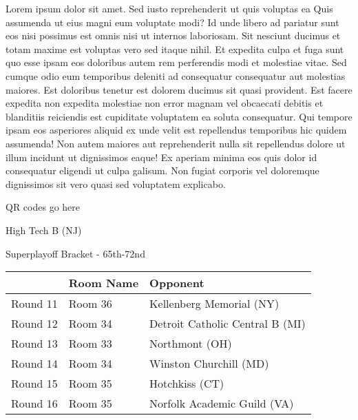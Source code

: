 \documentclass{article}%
\begin{document}
\vspace*{8pt}%
\linebreak%
\newline%
\newline%
    Lorem ipsum dolor sit amet. Sed iusto reprehenderit ut quis voluptas ea Quis assumenda ut eius magni eum voluptate modi? Id unde libero ad pariatur sunt eos nisi possimus est omnis nisi ut internos laboriosam. Sit nesciunt ducimus et totam maxime est voluptas vero sed itaque nihil. Et expedita culpa et fuga sunt quo esse ipsam eos doloribus autem rem perferendis modi et molestiae vitae.\newline%
\newline%
    Sed cumque odio eum temporibus deleniti ad consequatur consequatur aut molestias maiores. Est doloribus tenetur est dolorem ducimus sit quasi provident. Est facere expedita non expedita molestiae non error magnam vel obcaecati debitis et blanditiis reiciendis est cupiditate voluptatem ea soluta consequatur. Qui tempore ipsam eos asperiores aliquid ex unde velit est repellendus temporibus hic quidem assumenda!\newline%
\newline%
    Non autem maiores aut reprehenderit nulla sit repellendus dolore ut illum incidunt ut dignissimos eaque! Ex aperiam minima eos quis dolor id consequatur eligendi ut culpa galisum. Non fugiat corporis vel doloremque dignissimos sit vero quasi sed voluptatem explicabo.\newline%
\newline%
\vspace*{30pt}%
\begin{center}%
\begin{Huge}%
QR codes go here%
\end{Huge}%
\end{center}%
\newpage%
\begin{center}%
\begin{Huge}%
High Tech B (NJ)%
\end{Huge}%
\vspace*{8pt}%
\linebreak%
\begin{Large}%
Superplayoff Bracket {-} 65th{-}72nd%
\end{Large}%
\end{center}%
%
\begin{tabularx}{\textwidth}{|c|Y|Y|}%
\hline%
&Room Name&Opponent\\%
\hline%
Round 11&Room 36&Kellenberg Memorial (NY)\\%
Round 12&Room 34&Detroit Catholic Central B (MI)\\%
Round 13&Room 33&Northmont (OH)\\%
Round 14&Room 34&Winston Churchill (MD)\\%
Round 15&Room 35&Hotchkiss (CT)\\%
Round 16&Room 35&Norfolk Academic Guild (VA)\\%
\hline%
\end{tabularx}%
\end{document}
